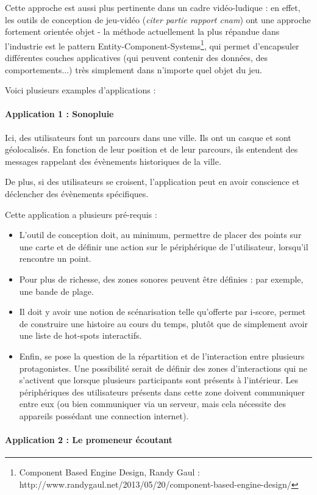 \documentclass[french]{article}
\begin{document}
Cette approche est aussi plus pertinente dans un cadre vidéo-ludique : en effet, les outils de conception de jeu-vidéo (\textit{citer partie rapport cnam}) ont une approche fortement orientée objet - la méthode actuellement la plus répandue dans l'industrie est le pattern Entity-Component-Systems\footnote{Component Based Engine Design, Randy Gaul : http://www.randygaul.net/2013/05/20/component-based-engine-design/}, qui permet d'encapsuler différentes couches applicatives (qui peuvent contenir des données, des comportements...) très simplement dans n'importe quel objet du jeu.

Voici plusieurs examples d'applications :
\paragraph{Application 1 : Sonopluie}
Ici, des utilisateurs font un parcours dans une ville. Ils ont un casque et sont géolocalisés. En fonction de leur position et de leur parcours, ils entendent des messages rappelant des évènements historiques de la ville. 

De plus, si des utilisateurs se croisent, l'application peut en avoir conscience et déclencher des évènements spécifiques.

Cette application a plusieurs pré-requis : 
\begin{itemize}
\item L'outil de conception doit, au minimum, permettre de placer des points sur une carte et de définir une action sur le périphérique de l'utilisateur, lorsqu'il rencontre un point.
\item Pour plus de richesse, des zones sonores peuvent être définies : par exemple, une bande de plage.
\item Il doit y avoir une notion de scénarisation telle qu'offerte par i-score, permet de construire une histoire au cours du temps, plutôt que de simplement avoir une liste de hot-spots interactifs.
\item Enfin, se pose la question de la répartition et de l'interaction entre plusieurs protagonistes. Une possibilité serait de définir des zones d'interactions qui ne s'activent que lorsque plusieurs participants sont présents à l'intérieur. Les périphériques des utilisateurs présents dans cette zone doivent communiquer entre eux (ou bien communiquer via un serveur, mais cela nécessite des appareils possédant une connection internet).
\end{itemize}

\paragraph{Application 2 : Le promeneur écoutant}
\end{document}
